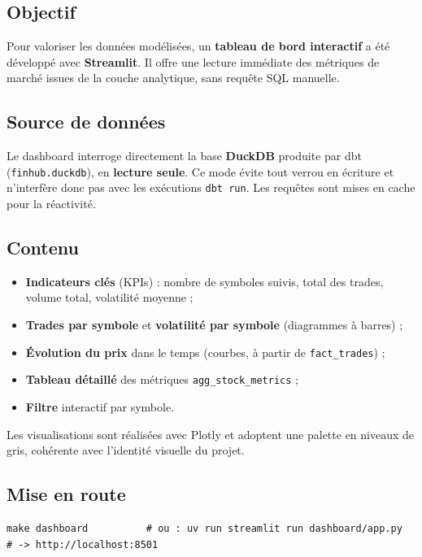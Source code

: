 \documentclass[11pt,a4paper]{article}
\newcommand{\code}[1]{\texttt{\small #1}}
\begin{document}
\subsection{Objectif}

Pour valoriser les données modélisées, un \textbf{tableau de bord interactif} a
été développé avec \textbf{Streamlit}. Il offre une lecture immédiate des
métriques de marché issues de la couche analytique, sans requête SQL manuelle.

\subsection{Source de données}

Le dashboard interroge directement la base \textbf{DuckDB} produite par dbt
(\code{finhub.duckdb}), en \textbf{lecture seule}. Ce mode évite tout verrou en
écriture et n'interfère donc pas avec les exécutions \code{dbt run}. Les
requêtes sont mises en cache pour la réactivité.

\subsection{Contenu}

\begin{itemize}
  \item \textbf{Indicateurs clés} (KPIs) : nombre de symboles suivis, total des
        trades, volume total, volatilité moyenne ;
  \item \textbf{Trades par symbole} et \textbf{volatilité par symbole}
        (diagrammes à barres) ;
  \item \textbf{Évolution du prix} dans le temps (courbes, à partir de
        \code{fact\_trades}) ;
  \item \textbf{Tableau détaillé} des métriques \code{agg\_stock\_metrics} ;
  \item \textbf{Filtre} interactif par symbole.
\end{itemize}

Les visualisations sont réalisées avec Plotly et adoptent une palette en
niveaux de gris, cohérente avec l'identité visuelle du projet.

\subsection{Mise en route}

\begin{lstlisting}
make dashboard          # ou : uv run streamlit run dashboard/app.py
# -> http://localhost:8501
\end{lstlisting}
\end{document}
